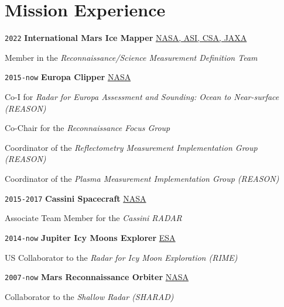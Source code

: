 \section*{Mission Experience}

\TabPositions{6em,33em}

\noindent \texttt{2022} \tab \textbf{International Mars Ice Mapper} \tab
\href{https://europa.nasa.gov/}{NASA, ASI, CSA, JAXA}
\begin{adjustwidth}{2.5em}{}
Member in the \textit{Reconnaissance/Science Measurement Definition Team}
\end{adjustwidth}
\vspace{.5em}

\noindent \texttt{2015-now} \tab \textbf{Europa Clipper} \tab
\href{https://europa.nasa.gov/}{NASA}
\begin{adjustwidth}{2.5em}{}
Co-I for \textit{Radar for Europa Assessment and Sounding: Ocean to Near-surface (REASON)}
\end{adjustwidth}
\begin{adjustwidth}{2.5em}{}
Co-Chair for the \textit{Reconnaissance Focus Group}
\end{adjustwidth}
\begin{adjustwidth}{2.5em}{}
Coordinator of the \textit{Reflectometry Measurement Implementation Group (REASON)}
\end{adjustwidth}
\begin{adjustwidth}{2.5em}{}
Coordinator of the \textit{Plasma Measurement Implementation Group (REASON)}
\end{adjustwidth}
\vspace{.5em}

\noindent \texttt{2015-2017} \tab \textbf{Cassini Spacecraft} \tab
\href{https://www.nasa.gov/mission_pages/cassini/main/index.html}{NASA}
\begin{adjustwidth}{2.5em}{}
Associate Team Member for the \textit{Cassini RADAR}
\end{adjustwidth}
\vspace{.5em}

\noindent \texttt{2014-now} \tab \textbf{Jupiter Icy Moons Explorer} \tab
\href{https://sci.esa.int/web/juice}{ESA}
\begin{adjustwidth}{2.5em}{}
US Collaborator to the \textit{Radar for Icy Moon Exploration (RIME)}
\end{adjustwidth}
\vspace{.5em}

\noindent \texttt{2007-now} \tab \textbf{Mars Reconnaissance Orbiter} \tab
\href{https://mars.nasa.gov/mro/}{NASA}
\begin{adjustwidth}{2.5em}{}
Collaborator to the \textit{Shallow Radar (SHARAD)}
\end{adjustwidth}
\vspace{.5em}

